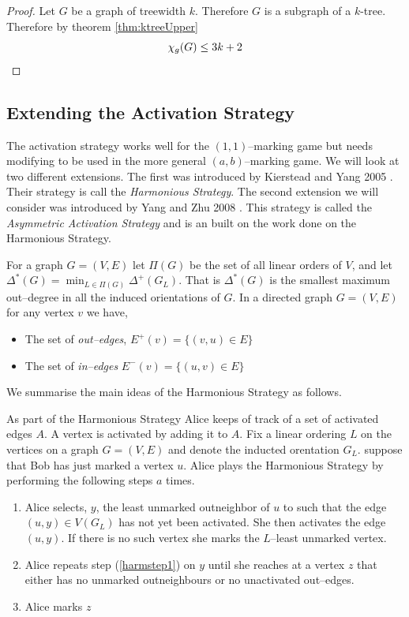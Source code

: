 \begin{proof}
    Let $G$ be a graph of treewidth $k$.
    Therefore $G$ is a subgraph of a $k$-tree. Therefore by theorem \ref{thm:ktreeUpper} \[\chi_g(G) \leq 3k + 2 \qedhere\] 
\end{proof}

\subsection{Extending the Activation Strategy}



The activation strategy works well for the $(1,1)$--marking game but needs modifying to be used in the more general $(a,b)$--marking game. We will look at two different extensions. The first was introduced by Kierstead and Yang 2005 \cite{kierYang2005}. Their strategy is call the \textit{Harmonious Strategy}. The second extension we will consider was introduced by Yang and Zhu 2008 \cite{yangZhu2008}. This strategy is called the \textit{Asymmetric Activation Strategy} and is an built on the work done on the Harmonious Strategy. 

For a graph $G=(V,E)$ let $\Pi(G)$ be the set of all linear orders of $V$, and let $\Delta^*(G)=\min_{L\in \Pi(G)}\Delta^+(G_L)$. That is $\Delta^*(G)$ is the smallest maximum out--degree in all the induced orientations of $G$. 
In a directed graph $G=(V,E)$ for any vertex $v$ we have, 
\begin{itemize}
    \item The set of \textit{out--edges}, $E^+(v) =\{(v,u)\in E\}$
    \item The set of \textit{in--edges} $E^-(v) =\{(u,v)\in E\}$ 
\end{itemize}  

We summarise the main ideas of the Harmonious Strategy as follows. 

As part of the Harmonious Strategy Alice keeps of track of a set of activated edges $A$. A vertex is activated by adding it to $A$.
Fix a linear ordering $L$ on the vertices on a graph $G=(V,E)$ and denote the inducted orentation $G_L$. suppose that Bob has just marked a vertex $u$. Alice plays the Harmonious Strategy by performing the following steps $a$ times.    
\begin{enumerate}
    \item  Alice selects, $y$, the least unmarked outneighbor of $u$ to such that the edge $(u,y)\in V(G_L)$ has not yet been activated. She then activates the edge $(u,y)$. If there is no such vertex she marks the $L$--least unmarked vertex. \label{harmstep1}
    \item  Alice repeats step (\ref{harmstep1}) on $y$ until she reaches at a vertex $z$ that either has no unmarked outneighbours or no unactivated out--edges. 
    \item  Alice marks $z$
\end{enumerate}


